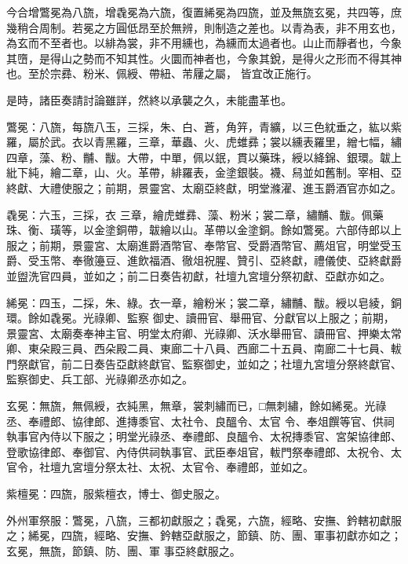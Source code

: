 \begin{pinyinscope}
 今合增鷩冕為八旒，增毳冕為六旒，復置絺冕為四旒，並及無旒玄冕，共四等，庶幾稍合周制。若冕之方圓低昂至於無辨，則制造之差也。以青為表，非不用玄也，為玄而不至者也。以緋為裳，非不用纁也，為纁而太過者也。山止而靜者也，今象其嶞，是得山之勢而不知其性。火圜而神者也，今象其銳，是得火之形而不得其神也。至於宗彞、粉米、佩綬、帶紐、芾屨之屬，
 皆宜改正施行。



 是時，諸臣奏請討論雖詳，然終以承襲之久，未能盡革也。



 鷩冕：八旒，每旒八玉，三採，朱、白、蒼，角笄，青纊，以三色紞垂之，紘以紫羅，屬於武。衣以青黑羅，三章，華蟲、火、虎蜼彞；裳以纁表羅里，繒七幅，繡四章，藻、粉、黼、黻。大帶，中單，佩以鈱，貫以藥珠，綬以絳錦、銀環。韍上紕下純，繪二章，山、火。革帶，緋羅表，金塗銀裝。襪、舄並如舊制。宰相、亞終獻、大禮使服之；前期，景靈宮、太廟亞終獻，明堂滌濯、進玉爵酒官亦如之。



 毳冕：六玉，三採，衣
 三章，繪虎蜼彞、藻、粉米；裳二章，繡黼、黻。佩藥珠、衡、璜等，以金塗銅帶，韍繪以山。革帶以金塗銅。餘如鷩冕。六部侍郎以上服之；前期，景靈宮、太廟進爵酒幣官、奉幣官、受爵酒幣官、薦俎官，明堂受玉爵、受玉幣、奉徹籩豆、進飲福酒、徹俎祝腥、贊引、亞終獻，禮儀使、亞終獻爵並盥洗官四員，並如之；前二日奏告初獻，社壇九宮壇分祭初獻、亞獻亦如之。



 絺冕：四玉，二採，朱、綠。衣一章，繪粉米；裳二章，繡黼、黻。綬以皂綾，銅環。餘如毳冕。光祿卿、監察
 御史、讀冊官、舉冊官、分獻官以上服之；前期，景靈宮、太廟奏奉神主官、明堂太府卿、光祿卿、沃水舉冊官、讀冊官、押樂太常卿、東朵殿三員、西朵殿二員、東廊二十八員、西廊二十五員、南廊二十七員、軷門祭獻官，前二日奏告亞獻終獻官、監察御史，並如之；社壇九宮壇分祭終獻官、監察御史、兵工部、光祿卿丞亦如之。



 玄冕：無旒，無佩綬，衣純黑，無章，裳刺繡而已，□無刺繡，餘如絺冕。光祿丞、奉禮郎、協律郎、進摶黍官、太社令、良醞令、太官
 令、奉俎饌等官、供祠執事官內侍以下服之；明堂光祿丞、奉禮郎、良醞令、太祝摶黍官、宮架協律郎、登歌協律郎、奉御官、內侍供祠執事官、武臣奉俎官，軷門祭奉禮郎、太祝令、太官令，社壇九宮壇分祭太社、太祝、太官令、奉禮郎，並如之。



 紫檀冕：四旒，服紫檀衣，博士、御史服之。



 外州軍祭服：鷩冕，八旒，三都初獻服之；毳冕，六旒，經略、安撫、鈐轄初獻服之；絺冕，四旒，經略、安撫、鈐轄亞獻服之，節鎮、防、團、軍事初獻亦如之；玄冕，無旒，節鎮、防、團、軍
 事亞終獻服之。




\end{pinyinscope}
